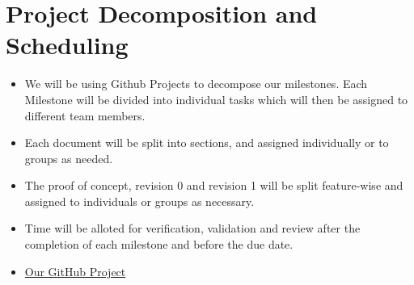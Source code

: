 \documentclass{article}
\begin{document}
\section{Project Decomposition and Scheduling}

\begin{itemize}
\item We will be using Github Projects to decompose our milestones. Each Milestone will be divided into
  individual tasks which will then be assigned to different team members.
\item Each document will be split into sections, and assigned individually or to groups as needed.
\item The proof of concept, revision 0 and revision 1 will be split feature-wise and assigned to individuals or
groups as necessary.
\item Time will be alloted for verification, validation and review after the completion of each milestone and
before the due date.
\item \href{https://github.com/users/Spitgranger/projects/2/views/1}{Our GitHub Project}
\end{itemize}
\newpage
\end{document}
